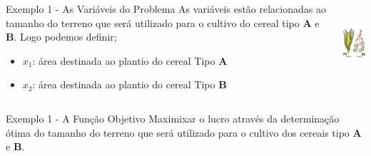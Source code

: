 \documentclass{beamer}
\begin{document}
\begin{frame}
{\begin{columns}
	\end{columns}
	}
	{
	\begin{columns}
		\begin{column}{0.7\textwidth}
			\centering
			\begin{exampleblock}{Exemplo 1 - As Variáveis do Problema}
				\scriptsize
				As variáveis estão relacionadas ao tamanho do terreno que será utilizado para o cultivo do cereal tipo \textbf{A} e \textbf{B}. Logo podemos definir;
				\begin{itemize}
				\item $x_1$: área destinada ao plantio do cereal Tipo \textbf{A}
				\item $x_2$: área destinada ao plantio do cereal Tipo \textbf{B} 
				\end{itemize}
			\end{exampleblock}
		\end{column}
		\begin{column}{0.3\textwidth}
			\centering
			\includegraphics[width=2cm,height=3cm]{milho_aveia2.png}
		\end{column}
	\end{columns}	
	}	
	\only<3-7>
	{
	\begin{columns}
		\begin{column}{0.7\textwidth}
			\centering
			\begin{exampleblock}{Exemplo 1 - A Função Objetivo}
				\scriptsize
				Maximixar o lucro através da determinação ótima do tamanho do terreno que será utilizado para o cultivo dos cereais tipo \textbf{A} e \textbf{B}. \\~\\
				

\end{exampleblock}
\end{column}
\end{columns}}
\end{frame}
\end{document}
